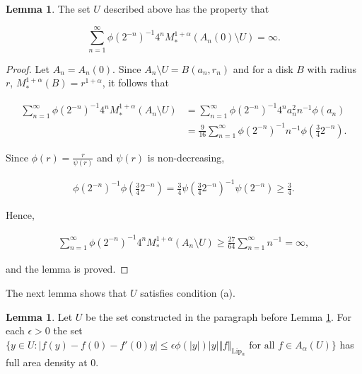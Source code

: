 \documentclass{article}
\theoremstyle{definition}
\newtheorem{lemma}[theorem]{Lemma}
\begin{document}
\begin{lemma}
\label{c is false}
    The set $U$ described above has the property that 

\begin{equation*}
    \sum_{n=1}^{\infty} \phi(2^{-n})^{-1} 4^{n} M_*^{1+\alpha}(A_n(0) \setminus U) = \infty.
\end{equation*}
    
\end{lemma}

\begin{proof}
  Let $A_n = A_n(0)$. Since $A_n \setminus U = B(a_n, r_n)$ and for a disk $B$ with radius $r$, $M_*^{1+\alpha}(B) = r^{1+\alpha}$, it follows that

\begin{align*}
   \sum_{n=1}^{\infty} \phi(2^{-n})^{-1} 4^{n} M_*^{1+\alpha}(A_n \setminus U) &= \sum_{n=1}^{\infty} \phi(2^{-n})^{-1} 4^{n} a_n^2 n^{-1} \phi(a_n)\\
   &= \frac{9}{16}\sum_{n=1}^{\infty} \phi(2^{-n})^{-1} n^{-1} \phi\left(\frac{3}{4}2^{-n}\right).
\end{align*}

\noindent Since $\phi(r) = \frac{r}{\psi(r)}$ and $\psi(r)$ is non-decreasing,

\begin{align*}
    \phi(2^{-n})^{-1} \phi\left(\frac{3}{4}2^{-n}\right) = \frac{3}{4} \psi \left(\frac{3}{4} 2^{-n}\right)^{-1} \psi(2^{-n}) \geq \frac{3}{4}.
\end{align*}


\noindent Hence,

\begin{align*}
    \sum_{n=1}^{\infty} \phi(2^{-n})^{-1} 4^{n} M_*^{1+\alpha}(A_n \setminus U) \geq \frac{27}{64} \sum_{n=1}^{\infty} n^{-1} = \infty,
\end{align*}

\noindent and the lemma is proved.

    
\end{proof}



The next lemma shows that $U$ satisfies condition (a).


\begin{lemma}
\label{a is true}
    Let $U$ be the set constructed in the paragraph before Lemma \ref{c is false}. For each $\epsilon>0$ the set $\{y\in U: \vert f(y)-f(0)-f'(0)y\vert \leq \epsilon \phi(\vert y\vert ) \vert y \vert \Vert f\Vert _{\text{Lip}_\alpha} \text{ for all } f \in A_{\alpha}(U)\}$ has full area density at $0$.
\end{lemma}
\end{document}
